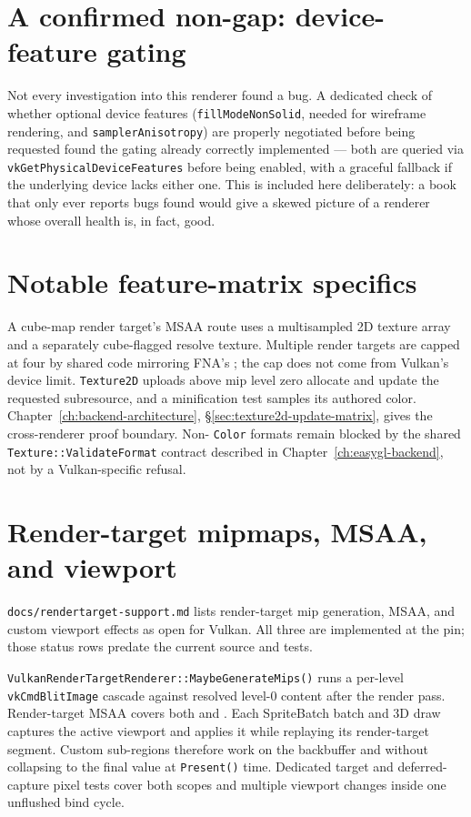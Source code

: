 \section{A confirmed non-gap: device-feature gating}

Not every investigation into this renderer found a bug. A dedicated check of whether optional
device features (\texttt{fillModeNonSolid}, needed for wireframe rendering, and
\texttt{samplerAnisotropy}) are properly negotiated before being requested found the gating
already correctly implemented --- both are queried via \texttt{vkGetPhysicalDeviceFeatures}
before being enabled, with a graceful fallback if the underlying device lacks either one.
This is included here deliberately: a book that only ever reports bugs found would give a
skewed picture of a renderer whose overall health is, in fact, good.

\section{Notable feature-matrix specifics}

A cube-map render target's MSAA route uses a multisampled 2D texture array and a separately
cube-flagged resolve texture. Multiple render targets are capped at four by shared code mirroring
FNA's ; the cap does not come from Vulkan's device limit.
\texttt{Texture2D} uploads above mip level zero allocate and update the requested subresource,
and a minification test samples its authored color. Chapter~\ref{ch:backend-architecture},
\S\ref{sec:texture2d-update-matrix}, gives the cross-renderer proof boundary. Non-
\texttt{Color} formats remain blocked by the shared \texttt{Texture::ValidateFormat} contract
described in Chapter~\ref{ch:easygl-backend}, not by a Vulkan-specific refusal.

\section{Render-target mipmaps, MSAA, and viewport}

\begin{historynote}
\texttt{docs/rendertarget-support.md} lists render-target mip generation, MSAA, and custom
viewport effects as open for Vulkan. All three are implemented at the pin; those status rows
predate the current source and tests.
\end{historynote}

\texttt{VulkanRenderTargetRenderer::MaybeGenerateMips()} runs a per-level
\texttt{vkCmdBlitImage} cascade against resolved level-0 content after the render pass.
Render-target MSAA covers both  and . Each
SpriteBatch batch and 3D draw captures the active viewport and applies it while replaying its
render-target segment. Custom sub-regions therefore work on the backbuffer and
 without collapsing to the final value at \texttt{Present()} time.
Dedicated target and deferred-capture pixel tests cover both scopes and multiple viewport changes
inside one unflushed bind cycle.

